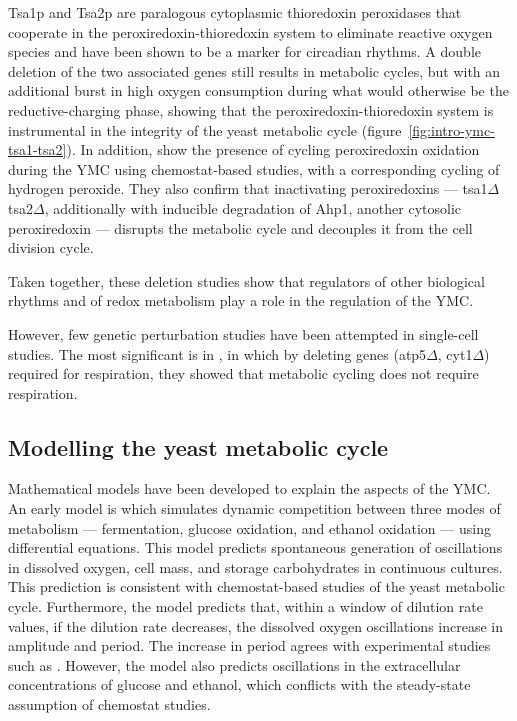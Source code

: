 Tsa1p and Tsa2p are paralogous cytoplasmic thioredoxin peroxidases that cooperate in the peroxiredoxin-thioredoxin system to eliminate reactive oxygen species and have been shown to be a marker for circadian rhythms.
A double deletion of the two associated genes still results in metabolic cycles, but with an additional burst in high oxygen consumption during what would otherwise be the reductive-charging phase, showing that the peroxiredoxin-thioredoxin system is instrumental in the integrity of the yeast metabolic cycle (figure~\ref{fig:intro-ymc-tsa1-tsa2}).
In addition, \textcite{amponsahPeroxiredoxinsCoupleMetabolism2021} show the presence of cycling peroxiredoxin oxidation during the YMC using chemostat-based studies, with a corresponding cycling of hydrogen peroxide.
They also confirm that inactivating peroxiredoxins --- tsa1$\Delta$ tsa2$\Delta$, additionally with inducible degradation of Ahp1, another cytosolic peroxiredoxin --- disrupts the metabolic cycle and decouples it from the cell division cycle.

Taken together, these deletion studies show that regulators of other biological rhythms and of redox metabolism play a role in the regulation of the YMC.

However, few genetic perturbation studies have been attempted in single-cell studies.
The most significant is in \textcite{baumgartnerFlavinbasedMetabolicCycles2018}, in which by deleting genes (atp5$\Delta$, cyt1$\Delta$) required for respiration, they showed that metabolic cycling does not require respiration.

\subsection{Modelling the yeast metabolic cycle}
\label{subsec:intro-ymc-model}


Mathematical models have been developed to explain the aspects of the YMC.
An early model is \textcite{jonesCyberneticModelGrowth1999} which simulates dynamic competition between three modes of metabolism --- fermentation, glucose oxidation, and ethanol oxidation --- using differential equations.
This model predicts spontaneous generation of oscillations in dissolved oxygen, cell mass, and storage carbohydrates in continuous cultures.
This prediction is consistent with chemostat-based studies of the yeast metabolic cycle.
Furthermore, the model predicts that, within a window of dilution rate values, if the dilution rate decreases, the dissolved oxygen oscillations increase in amplitude and period.
The increase in period agrees with experimental studies such as \textcite{oneillEukaryoticCellBiology2020}.
However, the model also predicts oscillations in the extracellular concentrations of glucose and ethanol, which conflicts with the steady-state assumption of chemostat studies.


